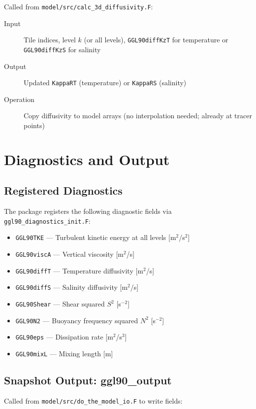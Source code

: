 \documentclass[11pt, a4paper]{article}
\begin{document}
Called from \texttt{model/src/calc\_3d\_diffusivity.F}:

\begin{description}
    \item[Input] Tile indices, level $k$ (or all levels), \texttt{GGL90diffKzT} for temperature or \texttt{GGL90diffKzS} for salinity
    \item[Output] Updated \texttt{KappaRT} (temperature) or \texttt{KappaRS} (salinity)
    \item[Operation] Copy diffusivity to model arrays (no interpolation needed; already at tracer points)
\end{description}

\section{Diagnostics and Output}

\subsection{Registered Diagnostics}

The package registers the following diagnostic fields via \texttt{ggl90\_diagnostics\_init.F}:

\begin{itemize}
    \item \texttt{GGL90TKE} — Turbulent kinetic energy at all levels [m$^2$/s$^2$]
    \item \texttt{GGL90viscA} — Vertical viscosity [m$^2$/s]
    \item \texttt{GGL90diffT} — Temperature diffusivity [m$^2$/s]
    \item \texttt{GGL90diffS} — Salinity diffusivity [m$^2$/s]
    \item \texttt{GGL90Shear} — Shear squared $S^2$ [s$^{-2}$]
    \item \texttt{GGL90N2} — Buoyancy frequency squared $N^2$ [s$^{-2}$]
    \item \texttt{GGL90eps} — Dissipation rate [m$^2$/s$^3$]
    \item \texttt{GGL90mixL} — Mixing length [m]
\end{itemize}

\subsection{Snapshot Output: ggl90\_output}

Called from \texttt{model/src/do\_the\_model\_io.F} to write fields:
\end{document}
